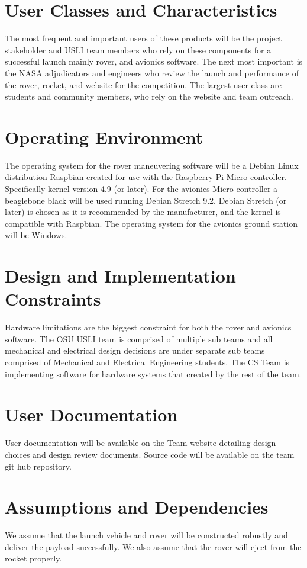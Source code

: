 \documentclass{scrreprt}
\begin{document}
\section{User Classes and Characteristics}
The most frequent and important users of these products will be the project  stakeholder and USLI team members who rely on these components for a successful launch mainly rover, and avionics software. The next most important is the NASA adjudicators and engineers who review the launch and performance of the rover, rocket, and website for the competition. The largest user class are students and community members, who rely on the website and team outreach.

\section{Operating Environment}
The operating system for the rover maneuvering software will be a Debian Linux distribution Raspbian created for use with the Raspberry Pi Micro controller. Specifically kernel version 4.9 (or later). For the avionics Micro controller a beaglebone black will be used running Debian Stretch 9.2. Debian Stretch (or later) is chosen as it is recommended by the manufacturer, and the kernel is compatible with Raspbian. The operating system for the avionics ground station will be Windows.
\section{Design and Implementation Constraints}
Hardware limitations are the biggest constraint for both the rover and avionics software. The OSU USLI team is comprised of multiple sub teams and all mechanical and electrical design decisions are under separate sub teams comprised of Mechanical and Electrical Engineering students. The CS Team is implementing software for hardware systems that created by the rest of the team. 

\section{User Documentation}
User documentation will be available on the Team website detailing design choices and design review documents. Source code will be available on the team git hub repository.

\section{Assumptions and Dependencies}
We assume that the launch vehicle and rover will be constructed robustly and deliver the payload successfully. We also assume that the rover will eject from the rocket properly.
\end{document}
